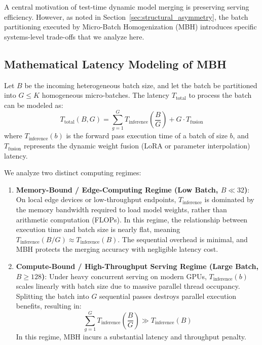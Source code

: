 \documentclass{article}
\theoremstyle{plain}
\theoremstyle{definition}
\theoremstyle{remark}
\begin{document}
A central motivation of test-time dynamic model merging is preserving serving efficiency. However, as noted in Section~\ref{sec:structural_asymmetry}, the batch partitioning executed by Micro-Batch Homogenization (MBH) introduces specific systems-level trade-offs that we analyze here.

\subsection{Mathematical Latency Modeling of MBH}
Let $B$ be the incoming heterogeneous batch size, and let the batch be partitioned into $G \le K$ homogeneous micro-batches. The latency $T_{\text{total}}$ to process the batch can be modeled as:
\begin{equation}
T_{\text{total}}(B, G) = \sum_{g=1}^G T_{\text{inference}}\left(\frac{B}{G}\right) + G \cdot T_{\text{fusion}}
\end{equation}
where $T_{\text{inference}}(b)$ is the forward pass execution time of a batch of size $b$, and $T_{\text{fusion}}$ represents the dynamic weight fusion (LoRA or parameter interpolation) latency. 

We analyze two distinct computing regimes:
\begin{enumerate}
    \item \textbf{Memory-Bound / Edge-Computing Regime (Low Batch, $B \ll 32$)}: On local edge devices or low-throughput endpoints, $T_{\text{inference}}$ is dominated by the memory bandwidth required to load model weights, rather than arithmetic computation (FLOPs). In this regime, the relationship between execution time and batch size is nearly flat, meaning $T_{\text{inference}}(B/G) \approx T_{\text{inference}}(B)$. The sequential overhead is minimal, and MBH protects the merging accuracy with negligible latency cost.
    \item \textbf{Compute-Bound / High-Throughput Serving Regime (Large Batch, $B \ge 128$)}: Under heavy concurrent serving on modern GPUs, $T_{\text{inference}}(b)$ scales linearly with batch size due to massive parallel thread occupancy. Splitting the batch into $G$ sequential passes destroys parallel execution benefits, resulting in:
    \begin{equation}
    \sum_{g=1}^G T_{\text{inference}}\left(\frac{B}{G}\right) \gg T_{\text{inference}}(B)
    \end{equation}
    In this regime, MBH incurs a substantial latency and throughput penalty.
\end{enumerate}
\end{document}
